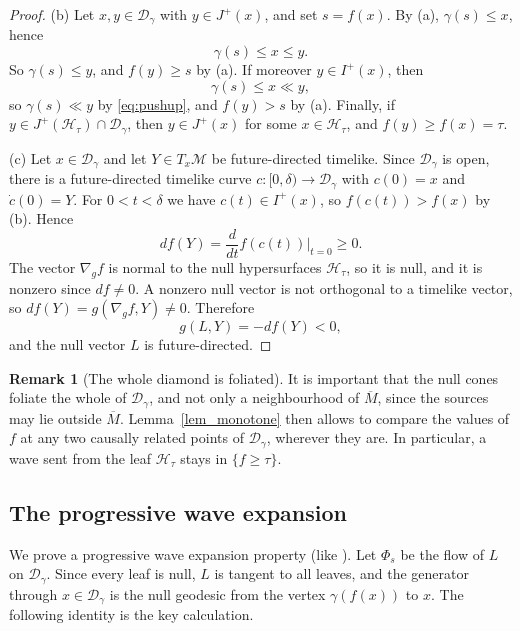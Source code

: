 \documentclass[12pt,reqno]{amsart}
\numberwithin{equation}{section}
\theoremstyle{definition}
\theoremstyle{plain}
\theoremstyle{definition}
\theoremstyle{definition}
\newtheorem{remark}[theorem]{Remark}
\newcommand{\M}{\mathcal{M}}
\newcommand{\D}{\mathcal{D}}
\newcommand{\Ht}{\mathcal{H}_{\tau}}
\newcommand{\dg}{\D_\gamma}
\newcommand{\uu}{M}
\begin{document}
\begin{proof}
(b) Let $x,y\in\dg$ with $y\in J^+(x)$, and set $s=f(x)$. By (a), $\gamma(s)\le x$, hence
\begin{equation*}
\gamma(s)\le x\le y.
\end{equation*}
So $\gamma(s)\le y$, and $f(y)\ge s$ by (a). If moreover $y\in I^+(x)$, then
\begin{equation*}
\gamma(s)\le x\ll y,
\end{equation*}
so $\gamma(s)\ll y$ by \eqref{eq:pushup}, and $f(y)>s$ by (a). Finally, if $y\in J^+(\Ht)\cap\dg$, then $y\in J^+(x)$ for some $x\in\Ht$, and $f(y)\ge f(x)=\tau$.

(c) Let $x\in\dg$ and let $Y\in T_x\M$ be future-directed timelike. Since $\dg$ is open, there is a future-directed timelike curve $c\colon[0,\delta)\to\dg$ with $c(0)=x$ and $\dot c(0)=Y$. For $0<t<\delta$ we have $c(t)\in I^+(x)$, so $f(c(t))>f(x)$ by (b). Hence
\begin{equation*}
df(Y)=\frac{d}{dt}f(c(t))\Big|_{t=0}\ge0.
\end{equation*}
The vector $\nabla_gf$ is normal to the null hypersurfaces $\mathcal H_\tau$, so it is null, and it is nonzero since $df\ne0$. A nonzero null vector is not orthogonal to a timelike vector, so $df(Y)=g(\nabla_gf,Y)\ne0$. Therefore
\begin{equation*}
g(L,Y)=-df(Y)<0,
\end{equation*}
and the null vector $L$ is future-directed.
\end{proof}
\begin{remark}[The whole diamond is foliated]\label{rem_whole_diamond}
It is important that the null cones foliate the whole of $\dg$, and not only a neighbourhood of $\overline\uu$, since the sources may lie outside $\overline\uu$. Lemma~\ref{lem_monotone} then allows to compare the values of $f$ at any two causally related points of $\dg$, wherever they are. In particular, a wave sent from the leaf $\mathcal H_\tau$ stays in $\{f\ge\tau\}$.
\end{remark}

\subsection{The progressive wave expansion}

We prove a progressive wave expansion property (like \cite[Proposition 1.2]{doi:10.1137/21M1400596}). Let $\Phi_s$ be the flow of $L$ on $\dg$. Since every leaf is null, $L$ is tangent to all leaves, and the generator through $x\in\dg$ is the null geodesic from the vertex $\gamma(f(x))$ to $x$. The following identity is the key calculation.
\end{document}
